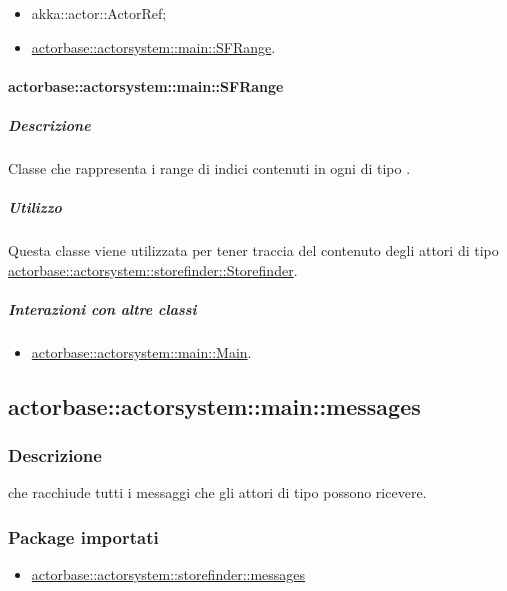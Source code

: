 \documentclass{scalatekids-article}
\begin{document}
\begin{itemize}
\item akka::actor::ActorRef;
\item \hyperref[sec:actorbase::actorsystem::main::SFRange]{actorbase::actorsystem::main::SFRange}.
\end{itemize}

\paragraph{actorbase::actorsystem::main::SFRange}
\label{sec:actorbase::actorsystem::main::SFRange}

\subparagraph{Descrizione}

Classe che rappresenta i range di indici contenuti in ogni  di tipo
.

\subparagraph{Utilizzo}

Questa classe viene utilizzata per tener traccia del contenuto degli attori di tipo
\hyperref[sec:actorbase::actorsystem::storefinder::Storefinder]{actorbase::\allowbreak{}actorsystem::\allowbreak{}storefinder::\allowbreak{}Storefinder}.

\subparagraph{Interazioni con altre classi}

\begin{itemize}
\item \hyperref[sec:actorbase::actorsystem::main::Main]{actorbase::actorsystem::main::Main}.
\end{itemize}

\subsection{actorbase::actorsystem::main::messages}
\label{sec:actorbase::actorsystem::main::messages}

\subsubsection{Descrizione}

 che racchiude tutti i messaggi che gli attori di tipo
 possono ricevere.

\subsubsection{Package importati}

\begin{itemize}
\item \hyperref[sec:actorbase::actorsystem::storefinder::messages]{actorbase::actorsystem::storefinder::messages}
\end{itemize}
\end{document}
